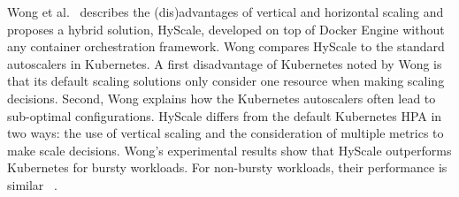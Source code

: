 Wong et al.~\citep{hyscale} describes the (dis)advantages of vertical and horizontal scaling and proposes a hybrid solution, HyScale, developed on top of Docker Engine without any container orchestration framework. 
%
%
%
%
Wong compares HyScale to the standard autoscalers in Kubernetes. A first disadvantage of Kubernetes noted by Wong is that its default scaling solutions only consider one resource when making scaling decisions. Second, Wong explains how the Kubernetes autoscalers often lead to sub-optimal configurations. 
HyScale differs from the default Kubernetes HPA in two ways: the use of vertical scaling and the consideration of multiple metrics to make scale decisions. 
Wong's experimental results show that HyScale outperforms Kubernetes for bursty workloads. For non-bursty workloads, their performance is similar
~\citep{hyscale}.


